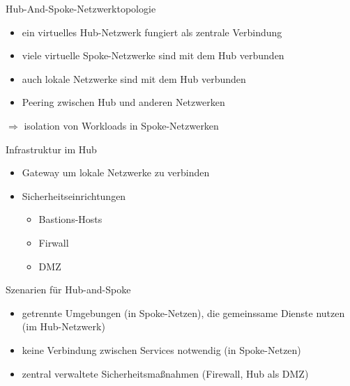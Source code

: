 

\begin{flashcard}[]{Hub-And-Spoke-Netzwerktopologie}
  \begin{itemize}
    \item ein virtuelles Hub-Netzwerk fungiert als zentrale Verbindung
    \item viele virtuelle Spoke-Netzwerke sind mit dem Hub verbunden
    \item auch lokale Netzwerke sind mit dem Hub verbunden
    \item Peering zwischen Hub und anderen Netzwerken
  \end{itemize}
  $\Rightarrow$ isolation von Workloads in Spoke-Netzwerken
\end{flashcard}

\begin{flashcard}[]{Infrastruktur im Hub}
  \begin{itemize}
    \item Gateway um lokale Netzwerke zu verbinden
    \item Sicherheitseinrichtungen
      \begin{itemize}
        \item Bastions-Hosts
        \item Firwall
        \item DMZ
      \end{itemize}
  \end{itemize}
\end{flashcard}

\begin{flashcard}[]{Szenarien für Hub-and-Spoke}
  \begin{itemize}
    \item getrennte Umgebungen (in Spoke-Netzen), die gemeinssame Dienste nutzen (im Hub-Netzwerk)
    \item keine Verbindung zwischen Services notwendig (in Spoke-Netzen)
    \item zentral verwaltete Sicherheitsmaßnahmen (Firewall, Hub als DMZ)
  \end{itemize}
\end{flashcard}

